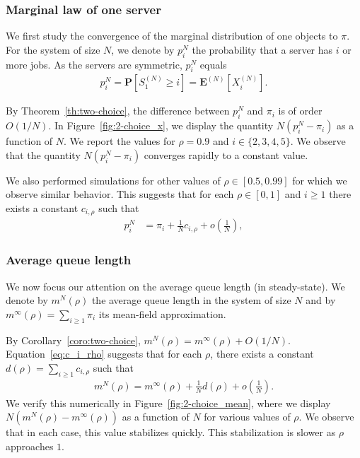 \documentclass[sigconf]{acmart}
\newcommand\SN{S^{(N)}}
\newcommand\XN{X^{(N)}}
\newcommand\espN[1]{\mathbf{E}^{(N)}\left[#1\right]}
\newcommand\sProba[1]{\mathbf{P}[#1]}
\newcommand\p[1]{\left(#1\right)}
\begin{document}
\subsubsection{Marginal law of one server}

We first study the convergence of the marginal distribution of one
objects to $\pi$. For the system of size $N$, we denote by $p^N_i$ the
probability that a server has $i$ or more jobs. As the servers are
symmetric, $p^N_i$ equals
\begin{align*}
  p^N_i=\sProba{\SN_1\ge i} = \espN{\XN_i}. 
\end{align*}

By Theorem~\ref{th:two-choice}, the difference between $p^N_i$ and
$\pi_i$ is of order $O(1/N)$. In Figure~\ref{fig:2-choice_x}, we
display the quantity $N(p^N_i-\pi_i)$ as a function of $N$. We report
the values for $\rho=0.9$ and $i\in\{2,3,4,5\}$. We observe that the
quantity $N(p^N_i-\pi_i)$ converges rapidly to a constant value. 

We also performed simulations for other values of $\rho\in[0.5,0.99]$
for which we observe similar behavior.  This suggests that for each
$\rho\in[0,1]$ and $i\ge1$ there exists a constant $c_{i,\rho}$ such
that
\begin{align}
  \label{eq:c_i_rho}
  p^N_i&=\pi_i + \frac1N c_{i,\rho} + o\p{\frac1N},
\end{align}


\subsubsection{Average queue length}


We now focus our attention on the average queue length (in
steady-state). We denote by $m^N(\rho)$ the average queue length in
the system of size $N$ and by $m^\infty(\rho)= \sum_{i\ge1}\pi_i$ its
mean-field approximation.

By Corollary~\ref{coro:two-choice},
$m^N(\rho) = m^\infty(\rho)+O(1/N)$. Equation~\eqref{eq:c_i_rho}
suggests that for each $\rho$, there exists a constant
$d(\rho)=\sum_{i\ge1}c_{i,\rho}$ such that
\begin{align}
  \label{eq:improved_mf}
  m^N(\rho)=m^\infty(\rho) + \frac{1}{N}d(\rho) + o\p{\frac1N}.
\end{align} 
We verify this numerically in Figure~\ref{fig:2-choice_mean}, where we
display $N(m^N(\rho)-m^\infty(\rho))$ as a function of $N$ for various
values of $\rho$.  We observe that in each case, this value stabilizes
quickly. This stabilization is slower as $\rho$ approaches $1$.
\end{document}
